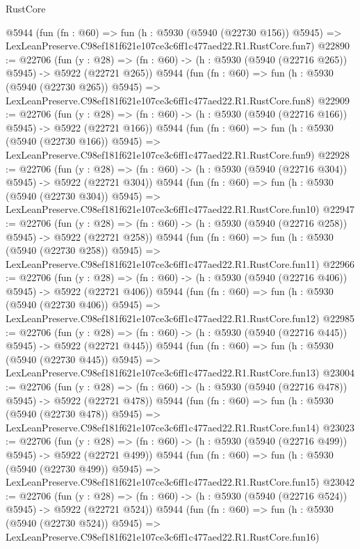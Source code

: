 \begin{lexlean}{RustCore}
\begin{coremodule}
    @5944
    (fun (fn : @60) =>
    fun (h : @5930 (@5940 (@22730 @156)) @5945) =>
    LexLeanPreserve.C98ef181f621e107ce3c6ff1c477aed22.R1.RustCore.fun7)
@22890 := @22706
    (fun (y : @28) => (fn : @60) -> (h : @5930 (@5940 (@22716 @265)) @5945) -> @5922 (@22721 @265))
    @5944
    (fun (fn : @60) =>
    fun (h : @5930 (@5940 (@22730 @265)) @5945) =>
    LexLeanPreserve.C98ef181f621e107ce3c6ff1c477aed22.R1.RustCore.fun8)
@22909 := @22706
    (fun (y : @28) => (fn : @60) -> (h : @5930 (@5940 (@22716 @166)) @5945) -> @5922 (@22721 @166))
    @5944
    (fun (fn : @60) =>
    fun (h : @5930 (@5940 (@22730 @166)) @5945) =>
    LexLeanPreserve.C98ef181f621e107ce3c6ff1c477aed22.R1.RustCore.fun9)
@22928 := @22706
    (fun (y : @28) => (fn : @60) -> (h : @5930 (@5940 (@22716 @304)) @5945) -> @5922 (@22721 @304))
    @5944
    (fun (fn : @60) =>
    fun (h : @5930 (@5940 (@22730 @304)) @5945) =>
    LexLeanPreserve.C98ef181f621e107ce3c6ff1c477aed22.R1.RustCore.fun10)
@22947 := @22706
    (fun (y : @28) => (fn : @60) -> (h : @5930 (@5940 (@22716 @258)) @5945) -> @5922 (@22721 @258))
    @5944
    (fun (fn : @60) =>
    fun (h : @5930 (@5940 (@22730 @258)) @5945) =>
    LexLeanPreserve.C98ef181f621e107ce3c6ff1c477aed22.R1.RustCore.fun11)
@22966 := @22706
    (fun (y : @28) => (fn : @60) -> (h : @5930 (@5940 (@22716 @406)) @5945) -> @5922 (@22721 @406))
    @5944
    (fun (fn : @60) =>
    fun (h : @5930 (@5940 (@22730 @406)) @5945) =>
    LexLeanPreserve.C98ef181f621e107ce3c6ff1c477aed22.R1.RustCore.fun12)
@22985 := @22706
    (fun (y : @28) => (fn : @60) -> (h : @5930 (@5940 (@22716 @445)) @5945) -> @5922 (@22721 @445))
    @5944
    (fun (fn : @60) =>
    fun (h : @5930 (@5940 (@22730 @445)) @5945) =>
    LexLeanPreserve.C98ef181f621e107ce3c6ff1c477aed22.R1.RustCore.fun13)
@23004 := @22706
    (fun (y : @28) => (fn : @60) -> (h : @5930 (@5940 (@22716 @478)) @5945) -> @5922 (@22721 @478))
    @5944
    (fun (fn : @60) =>
    fun (h : @5930 (@5940 (@22730 @478)) @5945) =>
    LexLeanPreserve.C98ef181f621e107ce3c6ff1c477aed22.R1.RustCore.fun14)
@23023 := @22706
    (fun (y : @28) => (fn : @60) -> (h : @5930 (@5940 (@22716 @499)) @5945) -> @5922 (@22721 @499))
    @5944
    (fun (fn : @60) =>
    fun (h : @5930 (@5940 (@22730 @499)) @5945) =>
    LexLeanPreserve.C98ef181f621e107ce3c6ff1c477aed22.R1.RustCore.fun15)
@23042 := @22706
    (fun (y : @28) => (fn : @60) -> (h : @5930 (@5940 (@22716 @524)) @5945) -> @5922 (@22721 @524))
    @5944
    (fun (fn : @60) =>
    fun (h : @5930 (@5940 (@22730 @524)) @5945) =>
    LexLeanPreserve.C98ef181f621e107ce3c6ff1c477aed22.R1.RustCore.fun16)

\end{coremodule}
\end{lexlean}
